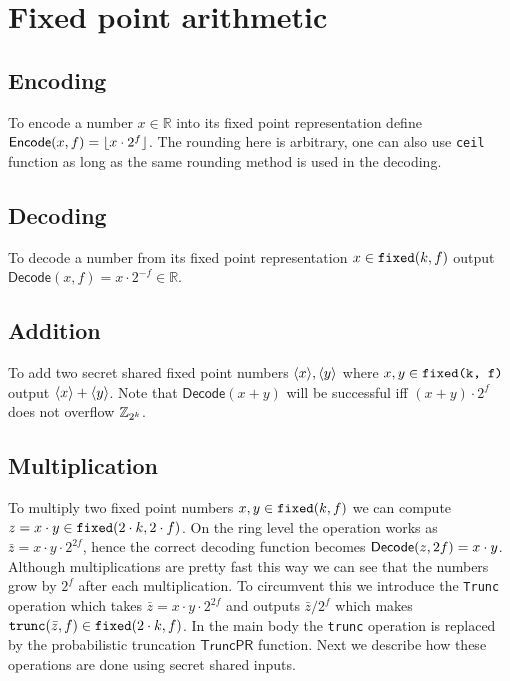 \section{Fixed point arithmetic}
\label{app:fixed-point}

\subsection{Encoding} To encode a number $x \in \mathbb{R}$ into its fixed
point representation define $\mathsf{Encode}(x, f) = \lfloor x \cdot 2^f\rfloor$.
The rounding here is arbitrary, one can also use \verb|ceil| function as long
as the same rounding method is used in the decoding.

\subsection{Decoding} To decode a number from its fixed point representation
$x \in \verb|fixed|(k, f)$ output $\mathsf{Decode}(x, f) = x \cdot 2^{-f} \in \mathbb{R}$.

\subsection{Addition} To add two secret shared fixed point numbers
$\langle {x} \rangle, \langle {y} \rangle$ where $x,y \in \verb|fixed(k, f)|$ output
$\langle {x} \rangle+\langle {y} \rangle$. Note that $\mathsf{Decode}(x+y)$ will be successful
iff $(x+y)\cdot 2^f$ does not overflow $\mathbb{Z}_{2^k}$.

\subsection{Multiplication}

To multiply two fixed point numbers $x, y \in \verb|fixed|(k, f)$ we can
compute $z = x \cdot y \in \verb|fixed|(2 \cdot k, 2\cdot f)$. On the ring
level the operation works as $\bar{z} = x \cdot y \cdot 2 ^ {2f}$, hence the
correct decoding function becomes $\mathsf{Decode}(z, 2f) = x \cdot y$. Although
multiplications are pretty fast this way we can see that the numbers grow by
$2^f$ after each multiplication. To circumvent this we introduce the
\verb|Trunc| operation which takes $\bar{z} = x \cdot y \cdot 2^{2f}$ and outputs $\bar{z} / 2^{f}$
which makes $\verb|trunc|(\bar{z}, f) \in \verb|fixed|(2 \cdot k, f)$.
In the main body the \verb|trunc| operation is replaced by the probabilistic truncation $\mathsf{TruncPR}$ function.
Next we describe how these operations are done using secret shared inputs.

